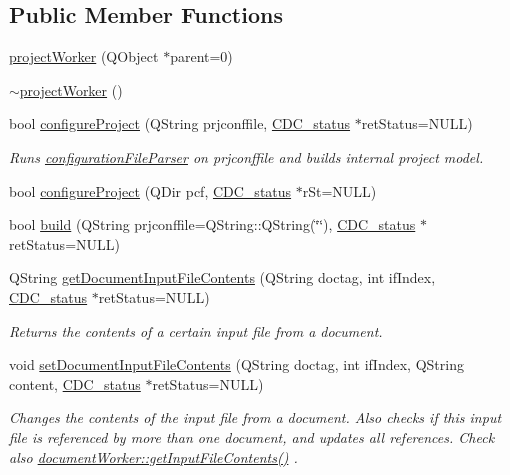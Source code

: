\subsection*{Public Member Functions}
\begin{DoxyCompactItemize}
\item 
\hyperlink{classproject_worker_a1fc4d7a88361b1f46232f7839f9ed40f}{project\+Worker} (Q\+Object $\ast$parent=0)
\item 
\hyperlink{classproject_worker_a584073fedfbbc9465ae1bdb16c9187f0}{$\sim$project\+Worker} ()
\item 
bool \hyperlink{classproject_worker_a1693b92f8d27a4487eb58827c6741de8}{configure\+Project} (Q\+String prjconffile, \hyperlink{cdcdefs_8h_a7a1ca742b5a041762c1b5784532bd7fd}{C\+D\+C\+\_\+status} $\ast$ret\+Status=N\+U\+L\+L)
\begin{DoxyCompactList}\small\item\em Runs \hyperlink{classconfiguration_file_parser}{configuration\+File\+Parser} on prjconffile and builds internal project model. \end{DoxyCompactList}\item 
bool \hyperlink{classproject_worker_a3674849ec41f25950e60277bdc2e1a68}{configure\+Project} (Q\+Dir pcf, \hyperlink{cdcdefs_8h_a7a1ca742b5a041762c1b5784532bd7fd}{C\+D\+C\+\_\+status} $\ast$r\+St=N\+U\+L\+L)
\item 
bool \hyperlink{classproject_worker_ae616cf4cb8461ef98b9f13e25751e5a8}{build} (Q\+String prjconffile=Q\+String\+::\+Q\+String(\char`\"{}\char`\"{}), \hyperlink{cdcdefs_8h_a7a1ca742b5a041762c1b5784532bd7fd}{C\+D\+C\+\_\+status} $\ast$ret\+Status=N\+U\+L\+L)
\item 
Q\+String \hyperlink{classproject_worker_ac9c8f8d67e7968c3537d0a8b78362706}{get\+Document\+Input\+File\+Contents} (Q\+String doctag, int if\+Index, \hyperlink{cdcdefs_8h_a7a1ca742b5a041762c1b5784532bd7fd}{C\+D\+C\+\_\+status} $\ast$ret\+Status=N\+U\+L\+L)
\begin{DoxyCompactList}\small\item\em Returns the contents of a certain input file from a document. \end{DoxyCompactList}\item 
void \hyperlink{classproject_worker_ae5f11f2acab566dc8a55eb758ba94834}{set\+Document\+Input\+File\+Contents} (Q\+String doctag, int if\+Index, Q\+String content, \hyperlink{cdcdefs_8h_a7a1ca742b5a041762c1b5784532bd7fd}{C\+D\+C\+\_\+status} $\ast$ret\+Status=N\+U\+L\+L)
\begin{DoxyCompactList}\small\item\em Changes the contents of the input file from a document. Also checks if this input file is referenced by more than one document, and updates all references. Check also \hyperlink{classdocument_worker_aefcc1bfe56d564865818ded4b258c20e}{document\+Worker\+::get\+Input\+File\+Contents()} . \end{DoxyCompactList}\item 

\end{DoxyCompactItemize}
